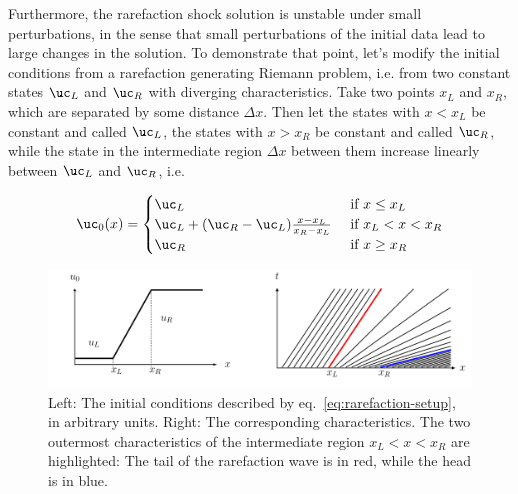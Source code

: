 Furthermore, the rarefaction shock solution is unstable under small perturbations, in the sense
that small perturbations of the initial data lead to large changes in the solution. To demonstrate
that point, let's modify the initial conditions from a rarefaction generating Riemann problem,
i.e. from two constant states $\uc_L$ and $\uc_R$ with diverging characteristics. Take two points
$x_L$ and $x_R$, which are separated by some distance $\Delta x$. Then let the states with $x < x_L$
be constant and called $\uc_L$, the states with $x > x_R$ be constant and called $\uc_R$, while the
state in the intermediate region $\Delta x$ between them increase linearly between $\uc_L$ and
$\uc_R$, i.e.

\begin{align}
    \uc_0(x) = \begin{cases}
                 \uc_L                                      & \text{ if } x \leq x_L \\
                 \uc_L + (\uc_R - \uc_L)\frac{x - x_L}{x_R - x_L} & \text{ if } x_L < x < x_R \\
                 \uc_R                                      & \text{ if } x \geq x_R   \\
               \end{cases} \label{eq:rarefaction-setup}
\end{align}

\begin{figure}[H]
    \centering
    \includegraphics[width=\linewidth]{./figures/FV/rarefaction_characteristics.pdf}%
    \caption[Rarefaction wave characteristics]{
Left: The initial conditions described by eq.~\ref{eq:rarefaction-setup}, in arbitrary units.
Right: The corresponding characteristics. The two outermost characteristics of the intermediate
region $x_L < x < x_R$ are highlighted: The tail of the rarefaction wave is in red, while the head
is in blue.
}
    \label{fig:rarefaction-setup}
\end{figure}

